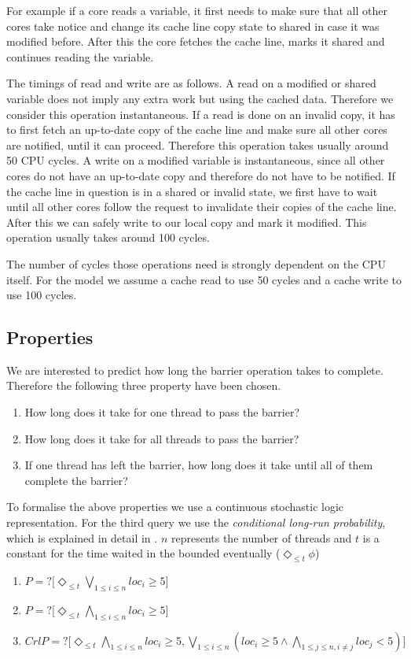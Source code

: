 \documentclass[a4paper, 10pt]{article}
\begin{document}
For example if a core reads a variable, it first needs to make sure that all other cores take notice and change its cache line copy state to shared in case it was modified before. After this the core fetches the cache line, marks it shared and continues reading the variable.

The timings of read and write are as follows. A read on a modified or shared variable does not imply any extra work but using the cached data. Therefore we consider this operation instantaneous. If a read is done on an invalid copy, it has to first fetch an up-to-date copy of the cache line and make sure all other cores are notified, until it can proceed. Therefore this operation takes usually around 50 CPU cycles. A write on a modified variable is instantaneous, since all other cores do not have an up-to-date copy and therefore do not have to be notified. If the cache line in question is in a shared or invalid state, we first have to wait until all other cores follow the request to invalidate their copies of the  cache line. After this we can safely write to our local copy and mark it modified. This operation usually takes around 100 cycles.

The number of cycles those operations need is strongly dependent on the CPU itself. For the model we assume a cache read to use 50 cycles and a cache write to use 100 cycles.
\subsection{Properties}
We are interested to predict how long the barrier operation takes to complete. Therefore the following three property have been chosen.
\begin{enumerate}
	\item How long does it take for one thread to pass the barrier?
	\item How long does it take for all threads to pass the barrier?
	\item If one thread has left the barrier, how long does it take until all of them complete the barrier?
\end{enumerate}

To formalise the above properties we use a continuous stochastic logic\cite{assb96}\cite{bkh99} representation. For the third query we use the \emph{conditional long-run probability}, which is explained in detail in \cite{fmix}. $n$ represents the number of threads and $t$ is a constant for the time waited in the bounded eventually ($\Diamond_{\le t} \phi$)
\begin{enumerate}
	\item $P=? \big[\Diamond_{\le t} \bigvee_{1 \le i \le n} loc_i \ge 5\big]$
	\item $P=? \big[\Diamond_{\le t} \bigwedge_{1 \le i \le n} loc_i \ge 5\big]$
	\item $CrlP=? \big[\Diamond_{\le t} \bigwedge_{1 \le i \le n} loc_i \ge 5, \bigvee_{1 \le i \le n} (loc_i \ge 5 \wedge \bigwedge_{1 \le j \le n, i \neq j} loc_j < 5)\big]$
\end{enumerate}
\end{document}
